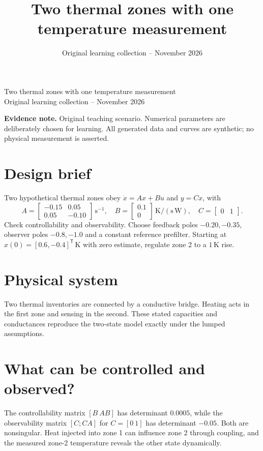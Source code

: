 \documentclass[10pt,a4paper]{article}
\title{\color{ink}Two thermal zones with one temperature measurement}
\author{}
\date{Original learning collection -- November 2026}
\begin{document}
\begin{center}{\LARGE\color{ink}Two thermal zones with one temperature measurement}\\[5pt]{\small Original learning collection -- November 2026}\end{center}

\textbf{Evidence note.} Original teaching scenario. Numerical parameters are deliberately chosen for learning. All generated data and curves are synthetic; no physical measurement is asserted.
\section{Design brief}
Two hypothetical thermal zones obey $\dot x=Ax+Bu$ and $y=Cx$, with
\[
A=\begin{bmatrix}-0.15&0.05\\0.05&-0.10\end{bmatrix}\,\mathrm{s^{-1}},
\quad B=\begin{bmatrix}0.1\\0\end{bmatrix}\,\mathrm{K/(s\,W)},
\quad C=\begin{bmatrix}0&1\end{bmatrix}.
\]
Check controllability and observability. Choose feedback poles $-0.20,-0.35$, observer poles $-0.8,-1.0$ and a constant reference prefilter. Starting at $x(0)=[0.6,-0.4]^{\mathsf T}\,\mathrm{K}$ with zero estimate, regulate zone 2 to a $1\,\mathrm{K}$ rise.
\section{Physical system}
\begin{center}\resizebox{.88\linewidth}{!}{}\par{\small Two thermal inventories are connected by a conductive bridge. Heating acts in the first zone and sensing in the second. These stated capacities and conductances reproduce the two-state model exactly under the lumped assumptions.}\end{center}
\section{What can be controlled and observed?}
The controllability matrix $[B\ AB]$ has determinant $0.0005$, while the observability matrix $[C;CA]$ for $C=[0\ 1]$ has determinant $-0.05$. Both are nonsingular. Heat injected into zone 1 can influence zone 2 through coupling, and the measured zone-2 temperature reveals the other state dynamically.
\end{document}
